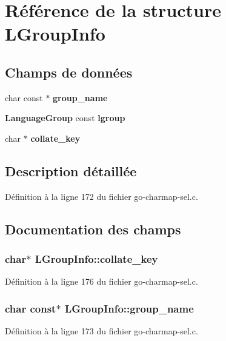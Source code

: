 \section{Référence de la structure LGroupInfo}
\label{structLGroupInfo}
\subsection*{Champs de données}
\begin{DoxyCompactItemize}
\item 
char const $\ast$ {\bf group\_\-name}
\item 
{\bf LanguageGroup} const {\bf lgroup}
\item 
char $\ast$ {\bf collate\_\-key}
\end{DoxyCompactItemize}


\subsection{Description détaillée}


Définition à la ligne 172 du fichier go-\/charmap-\/sel.c.



\subsection{Documentation des champs}
\subsubsection[{collate\_\-key}]{\setlength{\rightskip}{0pt plus 5cm}char$\ast$ {\bf LGroupInfo::collate\_\-key}}\label{structLGroupInfo_acde944e9ed66c9d6ecf420474e4fbcec}


Définition à la ligne 176 du fichier go-\/charmap-\/sel.c.

\subsubsection[{group\_\-name}]{\setlength{\rightskip}{0pt plus 5cm}char const$\ast$ {\bf LGroupInfo::group\_\-name}}\label{structLGroupInfo_a850ca0480725e307e0fd7ae879bdfcc1}


Définition à la ligne 173 du fichier go-\/charmap-\/sel.c.

